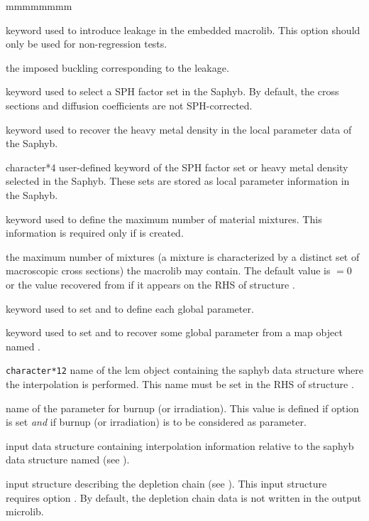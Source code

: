 \begin{ListeDeDescription}{mmmmmmmm}
\item[\moc{LEAK}] keyword used to introduce leakage in the embedded {\sc macrolib}. This option should only be used for non-regression tests.

\item[\dusa{b2}] the imposed buckling corresponding to the leakage.

\item[\moc{EQUI}] keyword used to select a SPH factor set in the Saphyb. By default, the cross sections and diffusion coefficients
are not SPH-corrected.

\item[\moc{MASL}] keyword used to recover the heavy metal density in the local parameter data of the Saphyb. 

\item[\dusa{TEXT4}] character*4 user-defined keyword of the SPH factor set or heavy metal density selected in the Saphyb. These sets are stored as local parameter information in the Saphyb.

\item[\moc{NMIX}] keyword used to define the maximum number of material mixtures. This information is required only if  is created.

\item[\dusa{nmixt}] the maximum number of mixtures (a mixture is characterized by a distinct set of 
macroscopic cross sections) the {\sc macrolib} may contain. The default value is  $=0$ or the value recovered from  if it appears on the RHS
of structure .

\item[\moc{SAPHYB}] keyword used to set  and to define each global parameter.

\item[\moc{TABLE}] keyword used to set  and to recover some global parameter from a {\sc map} object named .

\item[\dusa{SAPNAM}] {\tt character*12} name of the {\sc lcm} object containing the
{\sc saphyb} data structure where the interpolation is performed. This name must be set in the RHS of structure .

\item[\dusa{namburn}] name of the parameter for burnup (or irradiation).
This value is defined if option  is set {\sl and} if burnup (or irradiation) is to be considered as parameter.

\item[\dusa{descints}] input data structure containing interpolation information relative to the {\sc saphyb} data structure named  (see ).

\item[\dstr{descdepl}] input structure describing the depletion chain (see ). This input structure requires option . By
default, the depletion chain data is not written in the output {\sc microlib}.

\end{ListeDeDescription}

